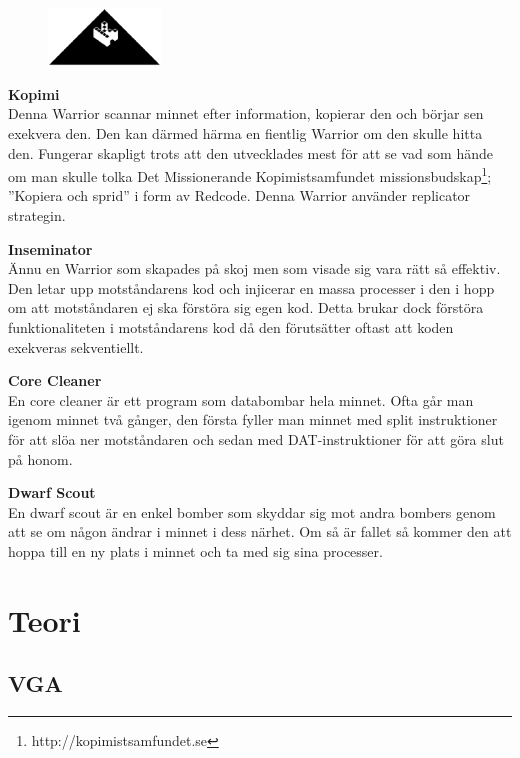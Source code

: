\documentclass[11pt]{article}
\begin{document}
\newpage

\begin{figure}[h]
    \begin{center}
        \includegraphics[width=3cm]{Kopimi.eps}
    \end{center}
\end{figure}

\textbf{Kopimi} \\
Denna Warrior scannar minnet efter information, kopierar den och börjar sen exekvera den. Den kan därmed härma en fientlig Warrior om den skulle hitta den. Fungerar skapligt trots att den utvecklades mest för att se vad som hände om man skulle tolka Det Missionerande Kopimistsamfundet missionsbudskap\footnote{http://kopimistsamfundet.se}; ”Kopiera och sprid” i form av Redcode. Denna Warrior använder replicator strategin.

\textbf{Inseminator} \\
Ännu en Warrior som skapades på skoj men som visade sig vara rätt så effektiv. Den letar upp motståndarens kod och injicerar en massa processer i den i hopp om att motståndaren ej ska förstöra sig egen kod. Detta brukar dock förstöra funktionaliteten i motståndarens kod då den förutsätter oftast att koden exekveras sekventiellt.

\textbf{Core Cleaner} \\
En core cleaner är ett program som databombar hela minnet. Ofta går man igenom minnet två gånger, den första fyller man minnet med split instruktioner för att slöa ner motståndaren och sedan med DAT-instruktioner för att göra slut på honom.

\textbf{Dwarf Scout} \\
En dwarf scout är en enkel bomber som skyddar sig mot andra bombers genom att se om någon ändrar i minnet i dess närhet. Om så är fallet så kommer den att hoppa till en ny plats i minnet och ta med sig sina processer.

\newpage

\section{Teori}

\subsection{VGA}
\end{document}
